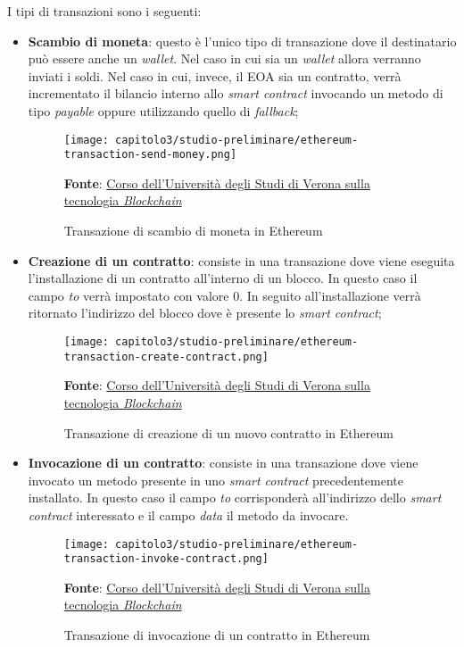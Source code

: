 \noindent I tipi di transazioni sono i seguenti:
\begin{itemize}
  \item \textbf{Scambio di moneta}: questo è l'unico tipo di transazione dove il destinatario può essere anche un \textit{wallet}. Nel caso in cui sia un \textit{wallet} allora verranno inviati i soldi. Nel caso in cui, invece, il EOA sia un contratto, verrà incrementato il bilancio interno allo \textit{smart contract} invocando un metodo di tipo \textit{payable} oppure utilizzando quello di \textit{fallback};
  
  \begin{figure}[h!]
    \centering
    \texttt{[image: capitolo3/studio-preliminare/ethereum-transaction-send-money.png]}
    \caption{Transazione di scambio di moneta in Ethereum}
    \textbf{Fonte}: \href{https://github.com/spoto/blockchain-course}{Corso dell'Università degli Studi di Verona sulla tecnologia \textit{Blockchain}} 
  \end{figure}

  \item \textbf{Creazione di un contratto}: consiste in una transazione dove viene eseguita l'installazione di un contratto all'interno di un blocco. In questo caso il campo \textit{to} verrà impostato con valore 0. In seguito all'installazione verrà ritornato l'indirizzo del blocco dove è presente lo \textit{smart contract};
  
  \begin{figure}[h!]
    \centering
    \texttt{[image: capitolo3/studio-preliminare/ethereum-transaction-create-contract.png]}
    \caption{Transazione di creazione di un nuovo contratto in Ethereum}
    \textbf{Fonte}: \href{https://github.com/spoto/blockchain-course}{Corso dell'Università degli Studi di Verona sulla tecnologia \textit{Blockchain}} 
  \end{figure}
  
  \item \textbf{Invocazione di un contratto}: consiste in una transazione dove viene invocato un metodo presente in uno \textit{smart contract} precedentemente installato. In questo caso il campo \textit{to} corrisponderà all'indirizzo dello \textit{smart contract} interessato e il campo \textit{data} il metodo da invocare.
  
  \begin{figure}[h!]
    \centering
    \texttt{[image: capitolo3/studio-preliminare/ethereum-transaction-invoke-contract.png]}
    \caption{Transazione di invocazione di un contratto in Ethereum}
    \textbf{Fonte}: \href{https://github.com/spoto/blockchain-course}{Corso dell'Università degli Studi di Verona sulla tecnologia \textit{Blockchain}} 
  \end{figure}
\end{itemize}

